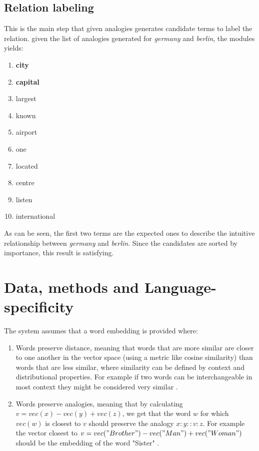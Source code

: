 \documentclass[11pt,a4paper]{article}
\begin{document}
\subsection{Relation labeling}
This is the main step that given analogies generates candidate terms to label the relation. given the list of analogies generated for \textit{germany} and \textit{berlin}, the modules yields:
\begin{enumerate}
\itemsep0em 
\item \textbf{city}
\item \textbf{capital}
\item largest
\item known
\item airport
\item one
\item located
\item centre
\item listen
\item international
\end{enumerate}
As can be seen, the first two terms are the expected ones to describe the intuitive relationship between \textit{germany} and \textit{berlin}. Since the candidates are sorted by importance, this result is satisfying.

\section{Data, methods and Language-specificity}
The system assumes that a word embedding is provided where:
\begin{enumerate}
\item Words preserve distance, meaning that words that are more similar are closer to one another in the vector space (using a metric like cosine similarity) 
than words that are less similar, where similarity can be defined by context and distributional properties. For example if two words can be 
interchangeable in most context they might be considered very similar \cite{mikolov2013linguistic}.
\item Words preserve analogies, meaning that by calculating $v = vec(x) - vec(y) + vec(z)$, we get that the word $w$ for which $vec(w)$ is 
closest to $v$ should preserve the analogy $x:y::v:z$. For example the vector closest to $v = vec("Brother") - vec("Man") + vec("Woman")$ should be 
the embedding of the word "Sister" \cite{mikolov2013linguistic}.
\end{enumerate}
\end{document}
